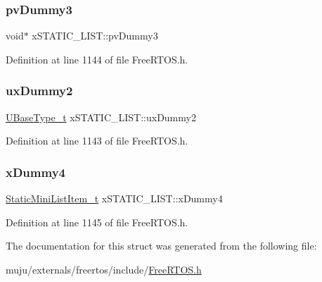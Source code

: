 \subsubsection{\texorpdfstring{pv\+Dummy3}{pvDummy3}}
{\footnotesize\ttfamily void$\ast$ x\+S\+T\+A\+T\+I\+C\+\_\+\+L\+I\+S\+T\+::pv\+Dummy3}



Definition at line 1144 of file Free\+R\+T\+O\+S.\+h.

\mbox{\label{structx_s_t_a_t_i_c___l_i_s_t_aa0522bc6ec8c956a9177ed9cb0e6d19f}} 
\subsubsection{\texorpdfstring{ux\+Dummy2}{uxDummy2}}
{\footnotesize\ttfamily \hyperlink{externals_2freertos_2portable_2_g_c_c_2_a_r_m___c_m0_2portmacro_8h_a646f89d4298e4f5afd522202b11cb2e6}{U\+Base\+Type\+\_\+t} x\+S\+T\+A\+T\+I\+C\+\_\+\+L\+I\+S\+T\+::ux\+Dummy2}



Definition at line 1143 of file Free\+R\+T\+O\+S.\+h.

\mbox{\label{structx_s_t_a_t_i_c___l_i_s_t_aafa5f9d67d7f3636f2d1f8c372e75ecf}} 
\subsubsection{\texorpdfstring{x\+Dummy4}{xDummy4}}
{\footnotesize\ttfamily \hyperlink{externals_2freertos_2include_2_free_r_t_o_s_8h_a9097f48f4dfa56e8e01d9179462c7994}{Static\+Mini\+List\+Item\+\_\+t} x\+S\+T\+A\+T\+I\+C\+\_\+\+L\+I\+S\+T\+::x\+Dummy4}



Definition at line 1145 of file Free\+R\+T\+O\+S.\+h.



The documentation for this struct was generated from the following file\+:\begin{DoxyCompactItemize}
\item 
muju/externals/freertos/include/\hyperlink{externals_2freertos_2include_2_free_r_t_o_s_8h}{Free\+R\+T\+O\+S.\+h}\end{DoxyCompactItemize}
